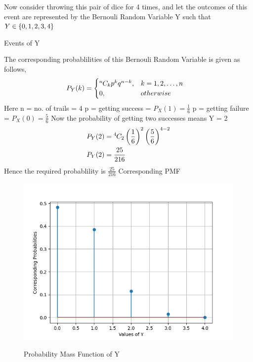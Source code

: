 \documentclass[journal,12pt,twocolumn]{IEEEtran}
\begin{document}
\begin{flushleft}
Now consider throwing this pair of dice for 4 times, and let the outcomes of this event are represented by the Bernouli Random Variable Y such that $Y \in \left\{0, 1, 2, 3, 4\right\}$
\begin{table}[h]
	\caption{Events of Y}
	\label{tab:mesh}
	
\end{table}
The corresponding probablilities of this Bernouli Random Variable is given as follows,
\begin{align}
	P_Y(k) &= \begin{cases} {{}^{n}\mkern-1muC_{k}} p^k q^{n-k} , & k = 1,2,\dots ,n \\
	0 , & otherwise \end{cases}
\end{align}
Here n = no. of trails = 4 \newline
p = getting success = $P_X(1) = \frac{1}{6}$ \newline
p = getting failure = $P_X(0) = \frac{5}{6}$ \newline
Now the probability of getting two successes means Y = 2
\begin{align}
	P_Y(2) &= {{}^{4}\mkern-1muC_{2}} \left(\frac{1}{6}\right)^2 \left(\frac{5}{6}\right)^{4-2} \\
	P_Y(2) &= \frac{25}{216}
\end{align}
Hence the required probablility is $\frac{25}{216}$ \newline
Corresponding PMF
\begin{figure}[h]
    \centering
	\includegraphics[width = \columnwidth]{plot}
	\label{fig:1}
	\caption{Probability Mass Function of Y}
\end{figure}
\end{flushleft}
\end{document}
